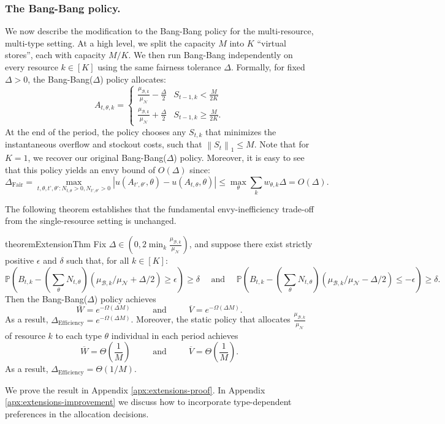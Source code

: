 \documentclass[mnsc,nonblindrev]{informs3}
\newcommand{\norm}[1]{\left \lVert #1 \right \rVert}
\newcommand{\pr}{\mathbb{P}}
\renewcommand{\Pr}{\pr}
\newcommand{\NDist}{\mathcal{N}}
\newcommand{\BDist}{\mathcal{B}}
\newcommand{\Nmean}{\mu_{\NDist}}
\newcommand{\ALG}{{Bang-Bang}\xspace}
\newcommand{\Deff}{\Delta_{\text{Efficiency}}\xspace}
\newcommand{\Dfair}{\Delta_{\text{Fair}}\xspace}
\renewcommand{\paragraph}[1]{\subsubsection*{#1}}
\begin{document}
\paragraph{The \ALG policy.} We now describe the modification to the \ALG policy for the multi-resource, multi-type setting.  At a high level, we split the capacity $M$ into $K$ ``virtual stores'', each with capacity $M/K$.  We then run \ALG independently on every resource $k \in [K]$ using the same fairness tolerance $\Delta$.  Formally, for fixed $\Delta > 0$, the \ALG($\Delta$) policy allocates:
\begin{equation}
\label{eq:bang_bang_pt_2_multi}
A_{t,\theta,k} = \begin{cases}
\frac{\mu_{\mathcal{B},k}}{\mu_{\mathcal{N}}} - \frac{\Delta}{2} & S_{t-1,k} < \frac{M}{2K} \\
\frac{\mu_{\mathcal{B},k}}{\mu_{\mathcal{N}}} + \frac{\Delta}{2} & S_{t-1,k} \geq \frac{M}{2K}.
\end{cases}
\end{equation}
At the end of the period, the policy chooses any $S_{t,k}$ that minimizes the instantaneous overflow and stockout costs, such that $\norm{S_t}_1 \leq M$. Note that for $K = 1$, we recover our original \ALG($\Delta$) policy. Moreover, it is easy to see that this policy yields an envy bound of $O(\Delta)$ since:
\[
\Dfair = \max_{t,\theta, t’, \theta': N_{t, \theta} > 0, N_{t', \theta'} > 0} | u(A_{t', \theta'}, \theta) - u(A_{t,\theta}, \theta)| \leq \max_{\theta} \sum_{k} w_{\theta,k} \Delta = O(\Delta).
\]

The following theorem establishes that the fundamental envy-inefficiency trade-off from the single-resource setting is unchanged.
\begin{restatable}{theorem}{ExtensionThm}
\label{thm:extensions}
Fix $\Delta \in (0, 2\min_k \frac{\mu_{\BDist,k}}{\Nmean})$, and suppose there exist strictly positive $\epsilon$ and $\delta$ such that, for all $k \in [K]$:
\[
    \Pr\left(B_{t,k} - \left(\sum_\theta N_{t,\theta}\right)(\mu_{\mathcal{B},k} / \Nmean + \Delta / 2) \geq \epsilon\right) \geq \delta \quad \text{ and } \quad \Pr\left(B_{t,k} - \left(\sum_\theta N_{t,\theta}\right)(\mu_{\mathcal{B},k} / \Nmean - \Delta / 2) \leq - \epsilon\right) \geq \delta.
\]
Then the \ALG($\Delta$) policy {achieves}
    $$\overline{W} = e^{-\Omega(\Delta M)} \;\;\;\;\;\;\;\; \text{ and }\;\;\;\;\;\;\;\; \overline{V} = e^{-\Omega(\Delta M)}.$$
    As a result, $\Deff = e^{-\Omega(\Delta M)}$.  Moreover, the static policy that allocates $\frac{\mu_{\BDist,k}}{\mu_{\NDist}}$ of resource $k$ to each type $\theta$ individual in each period {achieves}
    {$$\overline{W} = \Theta\left( \frac{1}{M} \right) \;\;\;\;\;\;\;\; \text{ and }\;\;\;\;\;\;\;\; \overline{V} = \Theta\left(\frac{1}{M}\right).$$
    As a result, $\Deff = \Theta(1 / M)$.} 
\end{restatable}
We prove the result in Appendix \ref{apx:extensions-proof}. In Appendix \ref{apx:extensions-improvement} we discuss how to incorporate type-dependent preferences in the allocation decisions.
\end{document}
